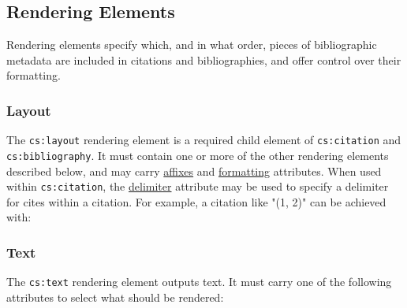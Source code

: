 \hypertarget{rendering-elements}{%
\subsection{Rendering Elements}\label{rendering-elements}}

Rendering elements specify which, and in what order, pieces of
bibliographic metadata are included in citations and bibliographies, and
offer control over their formatting.

\hypertarget{layout}{%
\subsubsection{Layout}\label{layout}}

The \texttt{cs:layout} rendering element is a required child element of
\texttt{cs:citation} and \texttt{cs:bibliography}. It must contain one
or more of the other rendering elements described below, and may carry
\protect\hyperlink{affixes}{affixes} and
\protect\hyperlink{formatting}{formatting} attributes. When used within
\texttt{cs:citation}, the \protect\hyperlink{delimiter}{delimiter}
attribute may be used to specify a delimiter for cites within a
citation. For example, a citation like "(1, 2)" can be achieved with:

\begin{Shaded}
\begin{Highlighting}[]
\NormalTok{\textless{}}\NormalTok{\textgreater{}}
\NormalTok{  \textless{}}\NormalTok{\textgreater{}}
\NormalTok{    \textless{}}\NormalTok{/\textgreater{}}
\NormalTok{  \textless{}/}\NormalTok{\textgreater{}}
\NormalTok{\textless{}/}\NormalTok{\textgreater{}}
\end{Highlighting}
\end{Shaded}

\hypertarget{text}{%
\subsubsection{Text}\label{text}}

The \texttt{cs:text} rendering element outputs text. It must carry one
of the following attributes to select what should be rendered:

